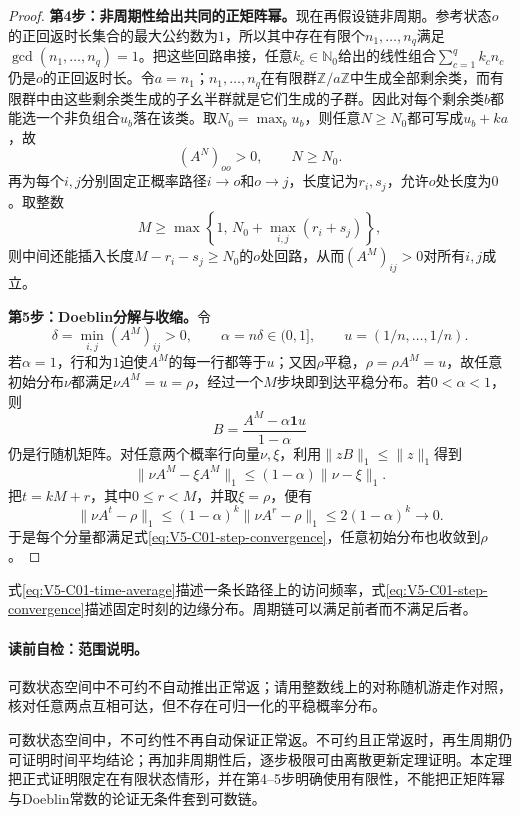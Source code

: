 \begin{proof}
\textbf{第4步：非周期性给出共同的正矩阵幂。}现在再假设链非周期。参考状态$o$的正回返时长集合的最大公约数为$1$，所以其中存在有限个$n_1,\ldots,n_q$满足$\gcd(n_1,\ldots,n_q)=1$。把这些回路串接，任意$k_c\in\mathbb N_0$给出的线性组合$\sum_{c=1}^q k_cn_c$仍是$o$的正回返时长。令$a=n_1$；$n_1,\ldots,n_q$在有限群$\mathbb Z/a\mathbb Z$中生成全部剩余类，而有限群中由这些剩余类生成的子幺半群就是它们生成的子群。因此对每个剩余类$b$都能选一个非负组合$u_b$落在该类。取$N_0=\max_bu_b$，则任意$N\ge N_0$都可写成$u_b+ka$，故
\[
(A^N)_{oo}>0,
\qquad N\ge N_0.
\]
再为每个$i,j$分别固定正概率路径$i\to o$和$o\to j$，长度记为$r_i,s_j$，允许$o$处长度为$0$。取整数
\[
M\ge\max\left\{1,\,N_0+\max_{i,j}(r_i+s_j)\right\},
\]
则中间还能插入长度$M-r_i-s_j\ge N_0$的$o$处回路，从而$(A^M)_{ij}>0$对所有$i,j$成立。

\textbf{第5步：Doeblin分解与收缩。}令
\[
\delta=\min_{i,j}(A^M)_{ij}>0,
\qquad
\alpha=n\delta\in(0,1],
\qquad
u=(1/n,\ldots,1/n).
\]
若$\alpha=1$，行和为$1$迫使$A^M$的每一行都等于$u$；又因$\rho$平稳，$\rho=\rho A^M=u$，故任意初始分布$\nu$都满足$\nu A^M=u=\rho$，经过一个$M$步块即到达平稳分布。若$0<\alpha<1$，则
\[
B=\frac{A^M-\alpha\mathbf 1u}{1-\alpha}
\]
仍是行随机矩阵。对任意两个概率行向量$\nu,\xi$，利用$\lVert zB\rVert_1\le\lVert z\rVert_1$得到
\[
\lVert\nu A^M-\xi A^M\rVert_1
\le(1-\alpha)\lVert\nu-\xi\rVert_1.
\]
把$t=kM+r$，其中$0\le r<M$，并取$\xi=\rho$，便有
\[
\lVert\nu A^t-\rho\rVert_1
\le(1-\alpha)^k\lVert\nu A^r-\rho\rVert_1
\le2(1-\alpha)^k\longrightarrow0.
\]
于是每个分量都满足式\eqref{eq:V5-C01-step-convergence}，任意初始分布也收敛到$\rho$。
\end{proof}
式\eqref{eq:V5-C01-time-average}描述一条长路径上的访问频率，式\eqref{eq:V5-C01-step-convergence}描述固定时刻的边缘分布。周期链可以满足前者而不满足后者。

\paragraph{读前自检：范围说明。}可数状态空间中不可约不自动推出正常返；请用整数线上的对称随机游走作对照，核对任意两点互相可达，但不存在可归一化的平稳概率分布。\par

\begin{keypointbox}[title=范围说明]
可数状态空间中，不可约性不再自动保证正常返。不可约且正常返时，再生周期仍可证明时间平均结论；再加非周期性后，逐步极限可由离散更新定理证明。本定理把正式证明限定在有限状态情形，并在第4--5步明确使用有限性，不能把正矩阵幂与Doeblin常数的论证无条件套到可数链。
\end{keypointbox}

